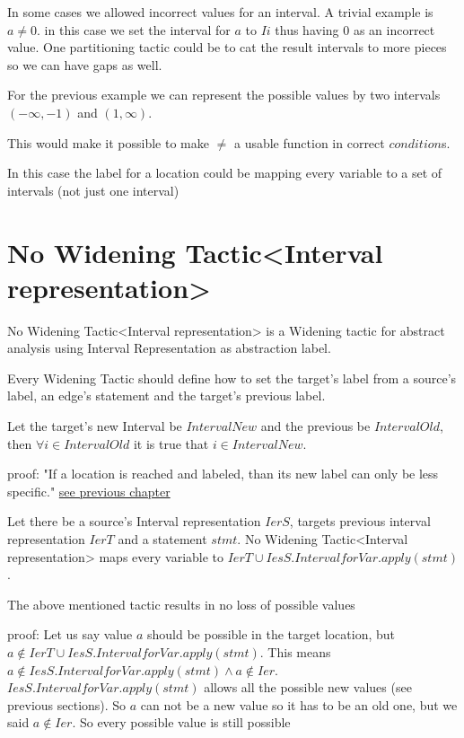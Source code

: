 In some cases we allowed incorrect values for an interval. A trivial example is $a \neq 0$. in this case we set the interval for $a$ to $Ii$ thus having $0$ as an incorrect value. One partitioning tactic could be to cat the result intervals to more pieces so we can have gaps as well.

For the previous example we can represent the possible values by two intervals $(-\infty, -1)$ and $(1, \infty)$.

This would make it possible to make $\neq$ a usable function in correct $condition$s.

In this case the label for a location could be mapping every variable to a set of intervals (not just one interval)

\section{No Widening Tactic<Interval representation>}

\begin{definition}
	No Widening Tactic<Interval representation> is a Widening tactic for abstract analysis using Interval Representation as abstraction label.
\end{definition}

Every Widening Tactic should define how to set the target's label from a source's label, an edge's statement and the target's previous label.

\begin{theorem}
	Let the target's new Interval be $IntervalNew$ and the previous be $IntervalOld$, then $\forall i \in IntervalOld$ it is true that $i \in  IntervalNew$.
\end{theorem}
{proof: } "If a location is reached and labeled, than its new label can only be less specific." \hyperref[sec:cfaalgorithm]{see previous chapter}

Let there be a source's Interval representation $IerS$, targets previous interval representation $IerT$ and a statement $stmt$. No Widening Tactic<Interval representation> maps every variable to $IerT \cup IesS.IntervalforVar.apply(stmt)$.

\begin{theorem}
	The above mentioned tactic results in no loss of possible values
\end{theorem}
{proof: } Let us say value $a$ should be possible in the target location, but $a \notin IerT \cup IesS.IntervalforVar.apply(stmt)$. This means $a \notin IesS.IntervalforVar.apply(stmt) \land a \notin Ier$. $IesS.IntervalforVar.apply(stmt)$ allows all the possible new values (see previous sections). So $a$ can not be a new value so it has to be an old one, but we said $a \notin Ier$. So every possible value is still possible
 

